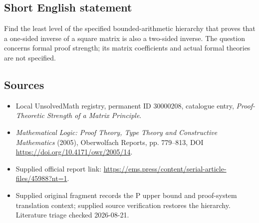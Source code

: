 \documentclass[11pt]{article}
\begin{document}
\subsection{Short English statement}
Find the least level of the specified bounded-arithmetic hierarchy that proves that a one-sided inverse of a square matrix is also a two-sided inverse. The question concerns formal proof strength; its matrix coefficients and actual formal theories are not specified.
\subsection{Sources}
\begin{itemize}
\item Local UnsolvedMath registry, permanent ID 30000208, catalogue entry, \emph{Proof-Theoretic Strength of a Matrix Principle}.
\item \emph{Mathematical Logic: Proof Theory, Type Theory and Constructive Mathematics} (2005), Oberwolfach Reports, pp. 779--813, DOI \url{https://doi.org/10.4171/owr/2005/14}.
\item Supplied official report link: \url{https://ems.press/content/serial-article-files/45988?nt=1}.
\item Supplied original fragment records the \(\mathrm P\) upper bound and proof-system translation context; supplied source verification restores the hierarchy. Literature triage checked 2026-08-21.
\end{itemize}
\end{document}
